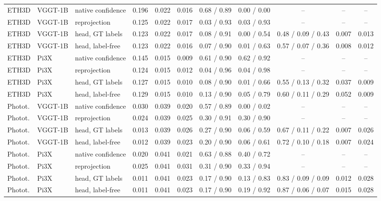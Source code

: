 \begin{tabular}{lll*{8}{c}}
ETH3D & VGGT-1B & native confidence & 0.196 & 0.022 & 0.016 & 0.68 / 0.89 & 0.00 / 0.00 & -- & -- & -- \\
ETH3D & VGGT-1B & reprojection & 0.125 & 0.022 & 0.017 & 0.03 / 0.93 & 0.03 / 0.93 & -- & -- & -- \\
ETH3D & VGGT-1B & head, GT labels & 0.123 & 0.022 & 0.017 & 0.08 / 0.91 & 0.00 / 0.54 & 0.48 / 0.09 / 0.43 & 0.007 & 0.013 \\
ETH3D & VGGT-1B & head, label-free & 0.123 & 0.022 & 0.016 & 0.07 / 0.90 & 0.01 / 0.63 & 0.57 / 0.07 / 0.36 & 0.008 & 0.012 \\
ETH3D & Pi3X & native confidence & 0.145 & 0.015 & 0.009 & 0.61 / 0.90 & 0.62 / 0.92 & -- & -- & -- \\
ETH3D & Pi3X & reprojection & 0.124 & 0.015 & 0.012 & 0.04 / 0.96 & 0.04 / 0.98 & -- & -- & -- \\
ETH3D & Pi3X & head, GT labels & 0.127 & 0.015 & 0.010 & 0.08 / 0.90 & 0.01 / 0.66 & 0.55 / 0.13 / 0.32 & 0.037 & 0.009 \\
ETH3D & Pi3X & head, label-free & 0.129 & 0.015 & 0.010 & 0.13 / 0.90 & 0.05 / 0.79 & 0.60 / 0.11 / 0.29 & 0.052 & 0.009 \\
Photot. & VGGT-1B & native confidence & 0.030 & 0.039 & 0.020 & 0.57 / 0.89 & 0.00 / 0.02 & -- & -- & -- \\
Photot. & VGGT-1B & reprojection & 0.024 & 0.039 & 0.025 & 0.30 / 0.91 & 0.30 / 0.90 & -- & -- & -- \\
Photot. & VGGT-1B & head, GT labels & 0.013 & 0.039 & 0.026 & 0.27 / 0.90 & 0.06 / 0.59 & 0.67 / 0.11 / 0.22 & 0.007 & 0.026 \\
Photot. & VGGT-1B & head, label-free & 0.012 & 0.039 & 0.023 & 0.20 / 0.90 & 0.06 / 0.61 & 0.72 / 0.10 / 0.18 & 0.007 & 0.024 \\
Photot. & Pi3X & native confidence & 0.020 & 0.041 & 0.021 & 0.63 / 0.88 & 0.40 / 0.72 & -- & -- & -- \\
Photot. & Pi3X & reprojection & 0.025 & 0.041 & 0.031 & 0.31 / 0.90 & 0.33 / 0.94 & -- & -- & -- \\
Photot. & Pi3X & head, GT labels & 0.011 & 0.041 & 0.023 & 0.17 / 0.90 & 0.13 / 0.83 & 0.83 / 0.09 / 0.09 & 0.012 & 0.028 \\
Photot. & Pi3X & head, label-free & 0.011 & 0.041 & 0.023 & 0.17 / 0.90 & 0.19 / 0.92 & 0.87 / 0.06 / 0.07 & 0.015 & 0.028 \\
\bottomrule
\end{tabular}
